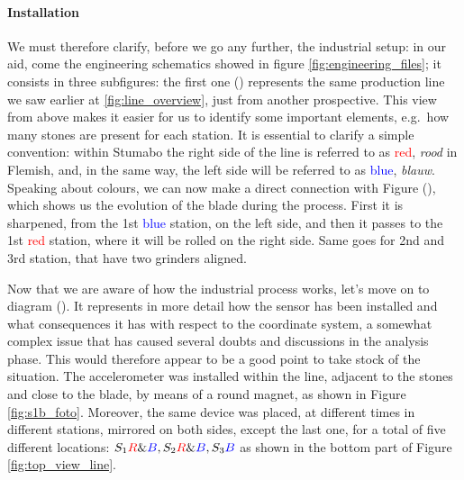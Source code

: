 \paragraph{Installation} We must therefore clarify, before we go any further, the industrial setup: in our aid, come the engineering schematics showed in figure \ref{fig:engineering_files};
it consists in three subfigures: the first one () represents the same production line we saw earlier at \ref{fig:line_overview}, just from another prospective. 
This view from above makes it easier for us to identify some important elements, e.g.\ how many stones are present for each station.
It is essential to clarify a simple convention: within Stumabo the right side of the line is referred to as \textcolor{red}{red}, \textit{rood} in Flemish, and, in the same way, 
the left side will be referred to as \textcolor{blue}{blue}, \textit{blauw}. 
Speaking about colours, we can now make a direct connection with Figure (), which shows us the evolution of the blade during the process.
First it is sharpened, from the 1st \textcolor{blue}{blue} station, on the left side, and then it passes to the 1st \textcolor{red}{red} station, where it will be rolled on the right side. 
Same goes for 2nd and 3rd station, that have two grinders aligned. 

Now that we are aware of how the industrial process works, let's move on to diagram ().
It represents in more detail how the sensor has been installed and what consequences it has with respect to the coordinate system, 
a somewhat complex issue that has caused several doubts and discussions in the analysis phase. This would therefore appear to be a good point to take stock of the situation.
The accelerometer was installed within the line, adjacent to the stones and close to the blade, by means of a round magnet, as shown in Figure \ref{fig:s1b_foto}.
Moreover, the same device was placed, at different times in different stations, mirrored on both sides, except the last one, for a total of five different locations: 
${S_{1}\textcolor{red}{R}\&\textcolor{blue}{B}, S_{2}\textcolor{red}{R}\&\textcolor{blue}{B}, S_{3}\textcolor{blue}{B}}$ as shown in the bottom part of Figure \ref{fig:top_view_line}.

